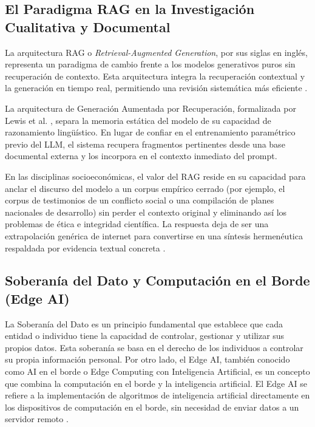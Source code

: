 \documentclass[12pt,a4paper]{article}
\begin{document}
\cite{munoz2025impacto}

\subsection{El Paradigma RAG en la Investigación Cualitativa y Documental}

La arquitectura RAG o \textit{Retrieval-Augmented Generation}, por sus siglas en inglés, representa un paradigma de cambio frente a los modelos generativos puros sin recuperación de contexto. Esta arquitectura integra la recuperación contextual y la generación en tiempo real, permitiendo una revisión sistemática más eficiente \cite{ferroestudio2025}.

La arquitectura de Generación Aumentada por Recuperación, formalizada por Lewis et al. \cite{lewis2020retrieval}, separa la memoria estática del modelo de su capacidad de razonamiento lingüístico. En lugar de confiar en el entrenamiento paramétrico previo del LLM, el sistema recupera fragmentos pertinentes desde una base documental externa y los incorpora en el contexto inmediato del prompt.

En las disciplinas socioeconómicas, el valor del RAG reside en su capacidad para anclar el discurso del modelo a un corpus empírico cerrado (por ejemplo, el corpus de testimonios de un conflicto social o una compilación de planes nacionales de desarrollo) sin perder el contexto original y eliminando así los problemas de ética e integridad científica. La respuesta deja de ser una extrapolación genérica de internet para convertirse en una síntesis hermenéutica respaldada por evidencia textual concreta \cite{munoz2025inteligencia}.



\subsection{Soberanía del Dato y Computación en el Borde (Edge AI)}

La Soberanía del Dato es un principio fundamental que establece que cada entidad o individuo tiene la capacidad de controlar, gestionar y utilizar sus propios datos. Esta soberanía se basa en el derecho de los individuos a controlar su propia información personal. Por otro lado, el Edge AI, también conocido como AI en el borde o Edge Computing con Inteligencia Artificial, es un concepto que combina la computación en el borde y la inteligencia artificial. El Edge AI se refiere a la implementación de algoritmos de inteligencia artificial directamente en los dispositivos de computación en el borde, sin necesidad de enviar datos a un servidor remoto \cite{bernal2026fair}.
\end{document}
